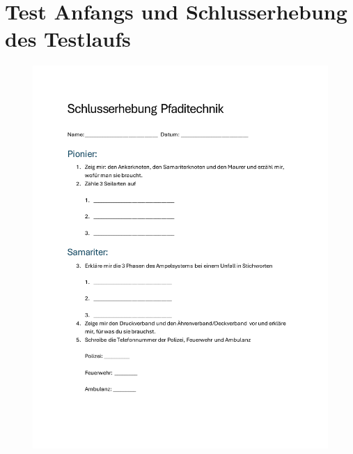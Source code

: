 \clearpage
\section{Test Anfangs und Schlusserhebung des Testlaufs}

\begin{figure}[!h]
    \centering
    \begin{minipage}[t]{0.49\textwidth}
        \centering
        \includegraphics[width=\textwidth]{Picture/seite1.pdf}
    \end{minipage}
    \begin{minipage}[t]{0.49\textwidth}
        \centering

\end{minipage}
\end{figure}
